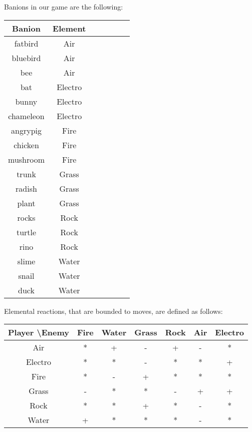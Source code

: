 \documentclass[12pt, a4paper]{report}
\begin{document}
    Banions in our game are the following:
\begin{center}
    \begin{tabular}{| c | c | c | c | c | c | c |}
        \hline
        Banion & Element \\ [0.5ex] %
        \hline\hline
        fatbird & Air \\
        \hline
        bluebird & Air \\
        \hline
        bee & Air \\
        \hline
        bat & Electro \\
        \hline
        bunny & Electro \\
        \hline
        chameleon & Electro \\
        \hline
        angrypig & Fire \\
        \hline
        chicken & Fire \\
        \hline
        mushroom & Fire \\
        \hline
        trunk & Grass \\
        \hline
        radish & Grass \\
        \hline
        plant & Grass \\
        \hline
        rocks & Rock \\
        \hline
        turtle & Rock \\
        \hline
        rino & Rock \\
        \hline
        slime & Water \\
        \hline
        snail & Water \\
        \hline
        duck & Water \\
        \hline
    \end{tabular}
\end{center}

    Elemental reactions, that are bounded to moves, are defined as follows:
\begin{center}
    \begin{tabular}{| c || c | c | c | c | c | c |}
        \hline
        Player \textbackslash Enemy & Fire & Water & Grass & Rock & Air & Electro \\ [0.5ex]
        \hline\hline
        Air & * & + & - & + & - & * \\
        \hline
        Electro & * & * & - & * & * & + \\
        \hline
        Fire & * & - & + & * & * & * \\
        \hline
        Grass & - & * & * & - & + & + \\
        \hline
        Rock & * & * & + & * & - & * \\
        \hline
        Water & + & * & * & * & - & * \\
        \hline
    \end{tabular}
\end{center}
\end{document}
